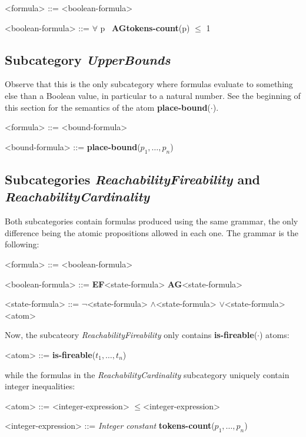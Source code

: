 \documentclass[10pt,english,a4paper]{article}
\newcommand\N                {\mathbb{N}}
\newcommand\ctla             {\textbf{A}\xspace}
\newcommand\ctle             {\textbf{E}\xspace}
\newcommand\ltlf             {\textbf{F}\xspace}
\newcommand\ltlg             {\textbf{G}\xspace}
\newcommand\logicnot         {\boldmath$\lnot$\xspace}
\newcommand\logicand         {\boldmath$\land$\xspace}
\newcommand\logicor          {\boldmath$\lor$\xspace}
\newcommand\quantall         {\boldmath$\forall$\xspace}
\newcommand\atomleq          {\boldmath$\leq$\xspace}
\newcommand\atomisfire[1]    {\textbf{is-fireable}(#1)}
\newcommand\atomplacebnd[1]  {\textbf{place-bound}(#1)}
\newcommand\atomtokenscnt[1] {\textbf{tokens-count}(#1)}
\newcommand\mysubsection[1]{\color{sectioncolor}\subsection{#1}\color{defaultcolor}}
\begin{document}
\begin{grammar}

<formula> ::= <boolean-formula>

<boolean-formula> ::= \quantall p~ \ctla \ltlg \atomtokenscnt{p} \atomleq 1

\end{grammar}

\mysubsection{Subcategory \textit{UpperBounds}}

Observe that this is the only subcategory where formulas evaluate to something
else than a Boolean value, in particular to %
a natural number. See the beginning of this section for the semantics
of the atom \atomplacebnd{$\cdot$}.

\begin{grammar}
<formula> ::= <bound-formula>

<bound-formula> ::= \atomplacebnd{$p_1, \ldots, p_n$}
\end{grammar}

\mysubsection{Subcategories \textit{ReachabilityFireability} and \textit{ReachabilityCardinality}}

Both subcategories contain formulas produced using the same grammar, the
only difference being the atomic propositions allowed in each one.
The grammar is the following:

\begin{grammar}
<formula> ::= <boolean-formula>

<boolean-formula> ::= \ctle \ltlf <state-formula>
\alt \ctla \ltlg <state-formula>

<state-formula> ::=  \logicnot  <state-formula>
 \logicand <state-formula>
 \logicor  <state-formula>
\alt <atom>
\end{grammar}

Now, the subcateory \emph{ReachabilityFireability} only contains
\atomisfire{$\cdot$} atoms:

\begin{grammar}
<atom> ::= \atomisfire{$t_1, \ldots, t_n$}
\end{grammar}

while the formulas in the \emph{ReachabilityCardinality} subcategory
uniquely contain integer inequalities:

\begin{grammar}
<atom> ::= <integer-expression> \atomleq <integer-expression>

<integer-expression> ::= \textit{Integer constant}
\alt \atomtokenscnt{$p_1, \ldots, p_n$}
\end{grammar}
\end{document}
